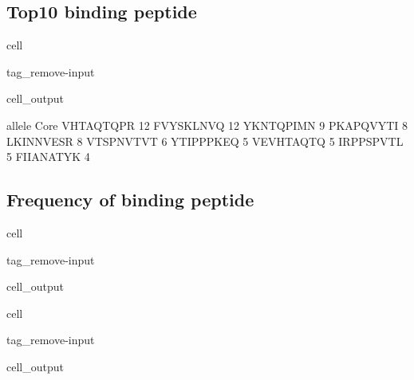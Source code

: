 \documentclass[letterpaper,10pt,english]{jupyterBook}
\begin{document}
\subsection{Top10 binding peptide}
\label{\detokenize{ipynb/chapter2:top10-binding-peptide}}
\begin{sphinxuseclass}{cell}
\begin{sphinxuseclass}{tag_remove-input}\begin{sphinxVerbatimOutput}

\begin{sphinxuseclass}{cell_output}
\begin{sphinxVerbatim}[commandchars=\\\{\}]
           allele
Core             
VHTAQTQPR      12
FVYSKLNVQ      12
YKNTQPIMN       9
PKAPQVYTI       8
LKINNVESR       8
VTSPNVTVT       6
YTIPPPKEQ       5
VEVHTAQTQ       5
IRPPSPVTL       5
FIIANATYK       4
\end{sphinxVerbatim}

\end{sphinxuseclass}\end{sphinxVerbatimOutput}

\end{sphinxuseclass}
\end{sphinxuseclass}

\subsection{Frequency of binding peptide}
\label{\detokenize{ipynb/chapter2:id2}}
\begin{sphinxuseclass}{cell}
\begin{sphinxuseclass}{tag_remove-input}\begin{sphinxVerbatimOutput}

\begin{sphinxuseclass}{cell_output}
\noindent{}

\end{sphinxuseclass}\end{sphinxVerbatimOutput}

\end{sphinxuseclass}
\end{sphinxuseclass}
\begin{sphinxuseclass}{cell}
\begin{sphinxuseclass}{tag_remove-input}\begin{sphinxVerbatimOutput}

\begin{sphinxuseclass}{cell_output}
\noindent{}

\end{sphinxuseclass}\end{sphinxVerbatimOutput}

\end{sphinxuseclass}
\end{sphinxuseclass}
\end{document}
